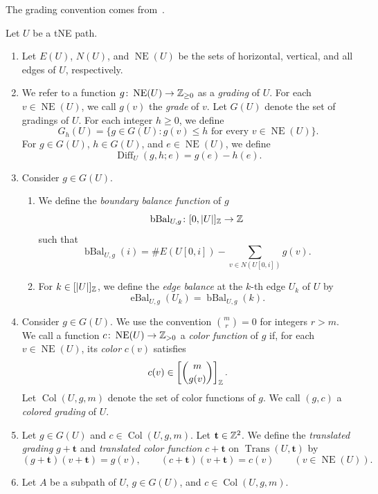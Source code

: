 The grading convention comes from~\cite{B}.

\begin{definition}\label{def:colored-grading}\label{def:balance}
Let $U$ be a tNE path.
\begin{enumerate}[font=\itshape]
\item Let $E(U)$, $N(U)$, and $\operatorname{NE}(U)$ be the sets of horizontal,
vertical, and all edges of $U$, respectively.
\item We refer to a function $g\colon \operatorname{NE}(U)\to\mathbb Z_{\ge0}$ as a
\textit{grading} of $U$. For each $v\in \operatorname{NE}(U)$, we call $g(v)$ the
\textit{grade} of $v$.
Let $G(U)$ denote the set of gradings of $U$.
For each integer $h\ge0$, we define
\[
 G_h(U)=\{g\in G(U):g(v)\le h\text{ for every }v\in\operatorname{NE}(U)\}.
\]
For $g\in G(U)$, $h\in G(U)$, and $e\in\operatorname{NE}(U)$, we define
\[
 \operatorname{Diff}_U(g,h;e)=g(e)-h(e).
\]
\item Consider $g\in G(U)$.
\begin{enumerate}[label=(\alph*),font=\itshape]
\item We define the
\textit{boundary balance function} of $g$
\[
 \operatorname{bBal}_{U,g}\colon
 [0,|U|]_{\mathbb Z}\to\mathbb Z
\]
such that
\[
 \operatorname{bBal}_{U,g}(i)
 =\#E(U[0,i])-\sum_{v\in N(U[0,i])}g(v).
\]
\item For $k\in[|U|]_{\mathbb Z}$, we define the \textit{edge balance} at the $k$-th edge $U_k$ of $U$ by
\[
 \operatorname{eBal}_{U,g}(U_k)=\operatorname{bBal}_{U,g}(k).
\]
\end{enumerate}
\item Consider $g\in G(U)$.
We use the convention $\binom{m}{r}=0$ for integers $r>m$.
We call a function $c\colon \operatorname{NE}(U)\to\mathbb Z_{>0}$ a \textit{color function} of $g$
if, for each $v\in \operatorname{NE}(U)$, its \textit{color} $c(v)$ satisfies
\[
 c(v)\in\left[\binom{m}{g(v)}\right]_{\mathbb Z}.
\]
Let $\operatorname{Col}(U,g,m)$ denote the set of color functions of $g$.
We call $(g,c)$ a \textit{colored grading} of $U$.
\item Let $g\in G(U)$ and $c\in\operatorname{Col}(U,g,m)$. Let $\mathbf t\in\mathbb Z^2$.
We define the \textit{translated grading} $g+\mathbf t$ and \textit{translated color function}
$c+\mathbf t$ on $\operatorname{Trans}(U,\mathbf t)$ by
\[
 (g+\mathbf t)(v+\mathbf t)=g(v),\qquad (c+\mathbf t)(v+\mathbf t)=c(v)
 \qquad(v\in\operatorname{NE}(U)).
\]
\item Let $A$ be a subpath of $U$, $g\in G(U)$, and $c\in\operatorname{Col}(U,g,m)$.

\end{enumerate}
\end{definition}
